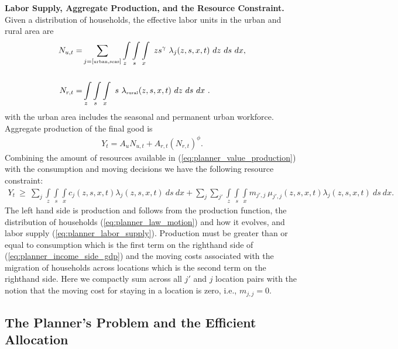 \documentclass[12pt,pdftex]{article}
\begin{document}
\begin{onehalfspacing}
\textbf{Labor Supply, Aggregate Production, and the Resource Constraint.} Given a distribution of households, the effective labor units in the urban and rural area are
\begin{align}
N_{u,t} =& \sum_{j = [\mbox{\tiny urban}, \mbox{\tiny seas}]}\int\limits_{z} \int\limits_{s} \int\limits_{x} \  z s^{\gamma} \ \lambda_j(z, s, x, t) \ dz \ ds \ dx, \nonumber
\\
\nonumber \\
N_{r,t} =& \int\limits_{z} \int\limits_{s} \int\limits_{x} \ s \ \lambda_{\mbox{\tiny rural}}(z, s, x, t)\ dz \ ds \ dx \ .
\label{eq:planner_labor_supply}
\end{align}
with the urban area includes the seasonal and permanent urban workforce. Aggregate production of the final good is
\begin{align}
Y_t = A_u N_{u,t} + A_{r,t} \left(N_{r,t} \right)^{\phi}.
\label{eq:planner_value_production}
\end{align}
Combining the amount of resources available in (\ref{eq:planner_value_production}) with the consumption and moving decisions we have the following resource constraint:
\begin{align}
Y_t\  \geq \ \sum_{j} \int\limits_{z} \int\limits_{s} \int\limits_{x} c_{j}(z, s, x, t) \lambda_{j}(z, s, x, t) \ ds \ dx + \sum_{j}\sum_{j'} \int\limits_{z} \int\limits_{s} \int\limits_{x}  m_{j',j} \ \mu_{j',j}(z,s, x, t) \lambda_{j}(z, s, x, t) \ ds \ dx.
\label{eq:planner_income_side_gdp}
\end{align}
The left hand side is production and follows from the production function, the distribution of households (\ref{eq:planner_law_motion}) and how it evolves, and  labor supply (\ref{eq:planner_labor_supply}). Production must be greater than or equal to consumption which is the first term on the righthand side of (\ref{eq:planner_income_side_gdp}) and the moving costs associated with the migration of households across locations which is the second term on the righthand side. Here we compactly sum across all $j'$ and $j$ location pairs with the notion that the moving cost for staying in a location is zero, i.e., $m_{j,j} = 0$.

\subsection{The Planner's Problem and the Efficient Allocation}


\end{onehalfspacing}
\end{document}
